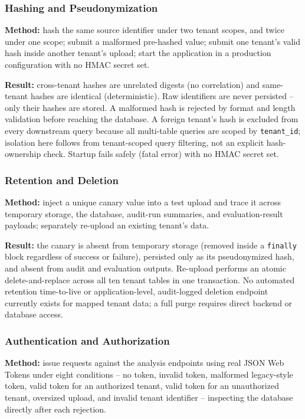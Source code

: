 \documentclass[11pt,a4paper]{article}
\begin{document}
\subsubsection{Hashing and Pseudonymization}
\label{sec:hash}
\textbf{Method:} hash the same source identifier under two tenant scopes, and twice under one scope; submit a malformed pre-hashed value; submit one tenant's valid hash inside another tenant's upload; start the application in a production configuration with no HMAC secret \cite{hmac} set.

\textbf{Result:} cross-tenant hashes are unrelated digests (no correlation) and same-tenant hashes are identical (deterministic). Raw identifiers are never persisted -- only their hashes are stored. A malformed hash is rejected by format and length validation before reaching the database. A foreign tenant's hash is excluded from every downstream query because all multi-table queries are scoped by \texttt{tenant\_id}; isolation here follows from tenant-scoped query filtering, not an explicit hash-ownership check. Startup fails safely (fatal error) with no HMAC secret set.

\subsubsection{Retention and Deletion}
\label{sec:retention}
\textbf{Method:} inject a unique canary value into a test upload and trace it across temporary storage, the database, audit-run summaries, and evaluation-result payloads; separately re-upload an existing tenant's data.

\textbf{Result:} the canary is absent from temporary storage (removed inside a \texttt{finally} block regardless of success or failure), persisted only as its pseudonymized hash, and absent from audit and evaluation outputs. Re-upload performs an atomic delete-and-replace across all ten tenant tables in one transaction. No automated retention time-to-live or application-level, audit-logged deletion endpoint currently exists for mapped tenant data; a full purge requires direct backend or database access.

\subsubsection{Authentication and Authorization}
\label{sec:auth}
\textbf{Method:} issue requests against the analysis endpoints using real JSON Web Tokens \cite{jwt} under eight conditions -- no token, invalid token, malformed legacy-style token, valid token for an authorized tenant, valid token for an unauthorized tenant, oversized upload, and invalid tenant identifier -- inspecting the database directly after each rejection.
\end{document}
